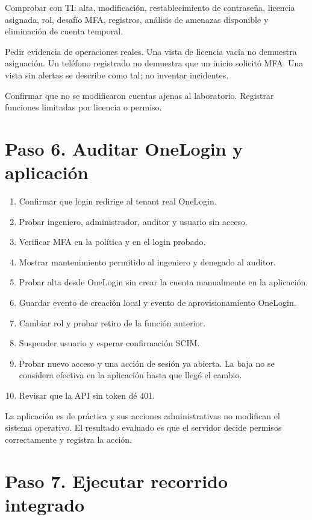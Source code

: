 \documentclass[12pt,a4paper]{article}
\begin{document}
Comprobar con TI: alta, modificación, restablecimiento de contraseña, licencia asignada, rol, desafío MFA, registros, análisis de amenazas disponible y eliminación de cuenta temporal.\par
Pedir evidencia de operaciones reales. Una vista de licencia vacía no demuestra asignación. Un teléfono registrado no demuestra que un inicio solicitó MFA. Una vista sin alertas se describe como tal; no inventar incidentes.\par
Confirmar que no se modificaron cuentas ajenas al laboratorio. Registrar funciones limitadas por licencia o permiso.\par
{}\section*{Paso 6. Auditar OneLogin y aplicación}
\begin{enumerate}
\item Confirmar que login redirige al tenant real OneLogin.
\item Probar ingeniero, administrador, auditor y usuario sin acceso.
\item Verificar MFA en la política y en el login probado.
\item Mostrar mantenimiento permitido al ingeniero y denegado al auditor.
\item Probar alta desde OneLogin sin crear la cuenta manualmente en la aplicación.
\item Guardar evento de creación local y evento de aprovisionamiento OneLogin.
\item Cambiar rol y probar retiro de la función anterior.
\item Suspender usuario y esperar confirmación SCIM.
\item Probar nuevo acceso y una acción de sesión ya abierta. La baja no se considera efectiva en la aplicación hasta que llegó el cambio.
\item Revisar que la API sin token dé 401.
\end{enumerate}
La aplicación es de práctica y sus acciones administrativas no modifican el sistema operativo. El resultado evaluado es que el servidor decide permisos correctamente y registra la acción.\par
{}\section*{Paso 7. Ejecutar recorrido integrado}
\end{document}

